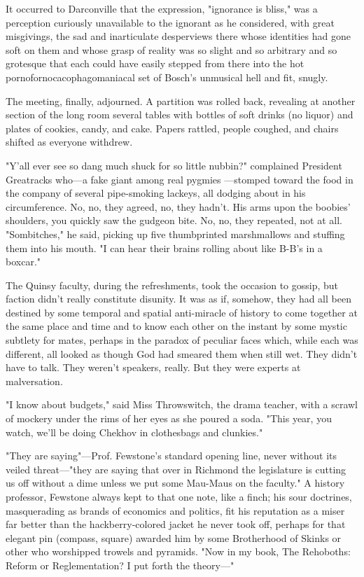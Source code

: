   It occurred to Darconville that the expression, "ignorance is bliss," was a
perception curiously unavailable to the ignorant as he considered, with great
misgivings, the sad and inarticulate desperviews there whose identities had gone
soft on them and whose grasp of reality was so slight and so arbitrary and so
grotesque that each could have easily stepped from there into the hot
pornofornocacophagomaniacal set of Bosch's unmusical hell and fit, snugly.

  The meeting, finally, adjourned. A partition was rolled back, revealing at
another section of the long room several tables with bottles of soft drinks (no
liquor) and plates of cookies, candy, and cake. Papers rattled, people coughed,
and chairs shifted as everyone withdrew.

  "Y'all ever see so dang much shuck for so little nubbin?" complained President
Greatracks who---a fake giant among real pygmies ---stomped toward the food in the
company of several pipe-smoking lackeys, all dodging about in his circumference.
No, no, they agreed, no, they hadn't. His arms upon the boobies' shoulders, you
quickly saw the gudgeon bite. No, no, they repeated, not at all. "Sombitches,"
he said, picking up five thumbprinted marshmallows and stuffing them into his
mouth. "I can hear their brains rolling about like B-B's in a boxcar."

  The Quinsy faculty, during the refreshments, took the occasion to gossip, but
faction didn't really constitute disunity. It was as if, somehow, they had all
been destined by some temporal and spatial anti-miracle of history to come
together at the same place and time and to know each other on the instant by
some mystic subtlety for mates, perhaps in the paradox of peculiar faces which,
while each was different, all looked as though God had smeared them when still
wet. They didn't have to talk. They weren't speakers, really. But they were
experts at malversation.

  "I know about budgets," said Miss Throwswitch, the drama teacher, with a
scrawl of mockery under the rims of her eyes as she poured a soda. "This year,
you watch, we'll be doing Chekhov in clothesbags and clunkies."

  "They are saying"---Prof. Fewstone's standard opening line, never without its
veiled threat---"they are saying that over in Richmond the legislature is cutting
us off without a dime unless we put some Mau-Maus on the faculty." A history
professor, Fewstone always kept to that one note, like a finch; his sour
doctrines, masquerading as brands of economics and politics, fit his reputation
as a miser far better than the hackberry-colored jacket he never took off,
perhaps for that elegant pin (compass, square) awarded him by some Brotherhood
of Skinks or other who worshipped trowels and pyramids. "Now in my book, The
Rehoboths: Reform or Reglementation? I put forth the theory---"

